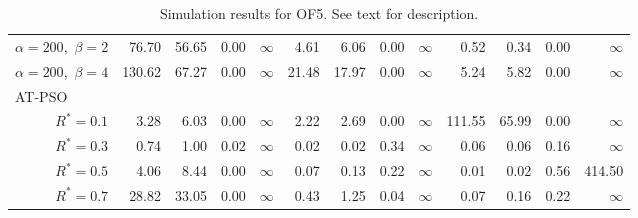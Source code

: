 \documentclass[12pt]{article}
\begin{document}
\begin{table}[ht]
{\begin{tabular}{r|rrrr|rrrr|rrrr}
  $\alpha = 200,$ $\beta =2$ & 76.70 & 56.65 & 0.00 & $\infty$ & 4.61 & 6.06 & 0.00 & $\infty$ & 0.52 & 0.34 & 0.00 & $\infty$ \\ 
  $\alpha = 200,$ $\beta =4$ & 130.62 & 67.27 & 0.00 & $\infty$ & 21.48 & 17.97 & 0.00 & $\infty$ & 5.24 & 5.82 & 0.00 & $\infty$ \\ 
\hline
\multicolumn{1}{l|}{AT-PSO} &&&&&&&&&&&&\\
  $R^* = 0.1$ & 3.28 & 6.03 & 0.00 & $\infty$ & 2.22 & 2.69 & 0.00 & $\infty$ & 111.55 & 65.99 & 0.00 & $\infty$ \\ 
  $R^* = 0.3$ & 0.74 & 1.00 & 0.02 & $\infty$ & 0.02 & 0.02 & 0.34 & $\infty$ & 0.06 & 0.06 & 0.16 & $\infty$ \\ 
  $R^* = 0.5$ & 4.06 & 8.44 & 0.00 & $\infty$ & 0.07 & 0.13 & 0.22 & $\infty$ & 0.01 & 0.02 & 0.56 & 414.50 \\ 
  $R^* = 0.7$ & 28.82 & 33.05 & 0.00 & $\infty$ & 0.43 & 1.25 & 0.04 & $\infty$ & 0.07 & 0.16 & 0.22 & $\infty$ \\ 
   \hline
\end{tabular}
}
\caption{Simulation results for OF5. See text for description.}
\label{tab:psosim5}
\end{table}
\end{document}
